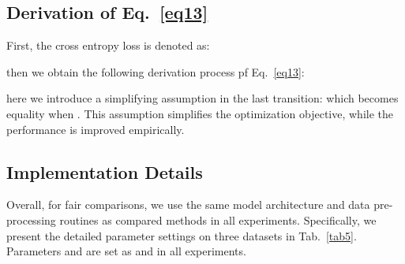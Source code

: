\documentclass[10pt,twocolumn,letterpaper]{article}
\begin{document}
\subsection{Derivation of Eq.~\ref{eq13}}
First, the cross entropy loss  is denoted as:

then we obtain the following derivation process pf Eq.~\ref{eq13}:

here we introduce a simplifying assumption in the last transition:
{\small }
which becomes equality when . This assumption simplifies the optimization objective, while the performance is improved empirically. 

\subsection{Implementation Details}
Overall, for fair comparisons, we use the same model architecture and data pre-processing routines as compared methods in all experiments. Specifically, we present the detailed parameter settings on three datasets in Tab.~\ref{tab5}. Parameters  and  are set as  and  in all experiments.
\end{document}
